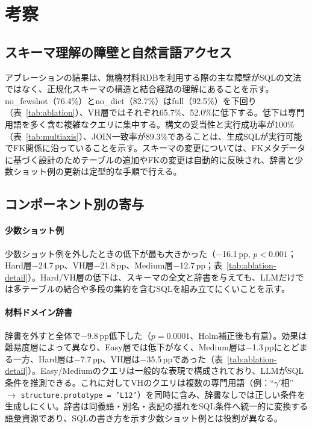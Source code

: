 \documentclass[twocolumn]{interact}
\begin{document}

\section{考察}
\label{sec:discussion}

\subsection{スキーマ理解の障壁と自然言語アクセス}

アブレーションの結果は、無機材料RDBを利用する際の主な障壁がSQLの文法ではなく、正規化スキーマの構造と結合経路の理解にあることを示す。no\_fewshot（76.4\%）とno\_dict（82.7\%）はfull（92.5\%）を下回り（表~\ref{tab:ablation}）、VH層ではそれぞれ65.7\%、52.0\%に低下する。低下は専門用語を多く含む複雑なクエリに集中する。構文の妥当性と実行成功率が100\%（表~\ref{tab:multiaxis}）、JOIN一致率が89.3\%であることは、生成SQLが実行可能でFK関係に沿っていることを示す。スキーマの変更については、FKメタデータに基づく設計のためテーブルの追加やFKの変更は自動的に反映され、辞書と少数ショット例の更新は定型的な手順で行える。

\subsection{コンポーネント別の寄与}
\label{sec:reranker_discussion}

\paragraph*{少数ショット例}
少数ショット例を外したときの低下が最も大きかった（$-$16.1\,pp, $p<0.001$；Hard層$-$24.7\,pp、VH層$-$21.8\,pp、Medium層$-$12.7\,pp；表~\ref{tab:ablation-detail}）。Hard/VH層の低下は、スキーマの全文と辞書を与えても、LLMだけでは多テーブルの結合や多段の集約を含むSQLを組み立てにくいことを示す。

\paragraph*{材料ドメイン辞書}
辞書を外すと全体で$-$9.8\,pp低下した（$p=0.0001$、Holm補正後も有意）。効果は難易度層によって異なり、Easy層では低下がなく、Medium層は$-$1.3\,ppにとどまる一方、Hard層は$-$7.7\,pp、VH層は$-$35.5\,ppであった（表~\ref{tab:ablation-detail}）。Easy/Mediumのクエリは一般的な表現で構成されており、LLMがSQL条件を推測できる。これに対してVHのクエリは複数の専門用語（例：``$\gamma'$相'' $\to$ \texttt{structure.prototype = 'L12'}）を同時に含み、辞書なしでは正しい条件を生成しにくい。辞書は同義語・別名・表記の揺れをSQL条件へ統一的に変換する語彙資源であり、SQLの書き方を示す少数ショット例とは役割が異なる。
\end{document}
